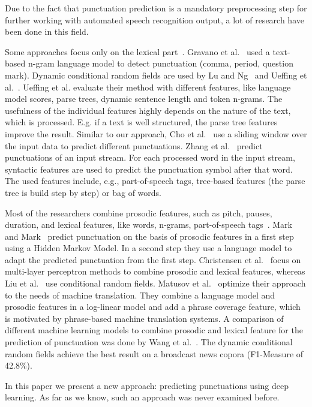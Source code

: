 Due to the fact that punctuation prediction is a mandatory preprocessing step for further working with automated speech recognition output, a lot of research have been done in this field.

Some approaches focus only on the lexical part~\cite{Gravano2009, Lu2010, Ueffing2013, Cho2012, Zhang2013}.
Gravano et al.~\cite{Gravano2009} used a text-based n-gram language model to detect punctuation (comma, period, question mark).
Dynamic conditional random fields are used by Lu and Ng~\cite{Lu2010} and Ueffing et al.~\cite{Ueffing2013}.
Ueffing et al. evaluate their method with different features, like language model scores, parse trees, dynamic sentence length and token n-grams.
The usefulness of the individual features highly depends on the nature of the text, which is processed.
E.g. if a text is well structured, the parse tree features improve the result.
Similar to our approach, Cho et al.~\cite{Cho2012} use a sliding window over the input data to predict different punctuations.
Zhang et al.~\cite{Zhang2013} predict punctuations of an input stream.
For each processed word in the input stream, syntactic features are used to predict the punctuation symbol after that word.
The used features include, e.g., part-of-speech tags, tree-based features (the parse tree is build step by step) or bag of words.

Most of the researchers combine prosodic features, such as pitch, pauses, duration, and lexical features, like words, n-grams, part-of-speech tags~\cite{Mark1999, Christensen2001, Liu2005, Matusov2007, Wang2012}.
Mark and Mark~\cite{Mark1999} predict punctuation on the basis of prosodic features in a first step using a Hidden Markov Model.
In a second step they use a language model to adapt the predicted punctuation from the first step.
Christensen et al.~\cite{Christensen2001} focus on multi-layer perceptron methods to combine prosodic and lexical features, whereas Liu et al.~\cite{Liu2005} use conditional random fields.
Matusov et al.~\cite{Matusov2007} optimize their approach to the needs of machine translation.
They combine a language model and prosodic features in a log-linear model and add a phrase coverage feature, which is motivated by phrase-based machine translation systems.
A comparison of different machine learning models to combine prosodic and lexical feature for the prediction of punctuation was done by Wang et al.~\cite{Wang2012}.
The dynamic conditional random fields achieve the best result on a broadcast news copora (F1-Measure of 42.8\%).

In this paper we present a new approach: predicting punctuations using deep learning.
As far as we know, such an approach was never examined before.


